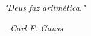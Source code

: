 \thispagestyle{empty}

\clearpage
\vspace*{0.7cm}
\vspace*{\fill}



\begin{quoting}[rightmargin=0cm,leftmargin=8cm]
	\noindent \textit{"Deus faz aritmética."}
 
                          \textit{- Carl F. Gauss}
\end{quoting}